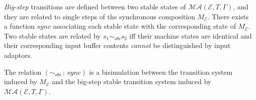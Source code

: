 \emph{Big-step} transitions are defined between two stable states of $\mathcal{MA}(\mathcal{E}, T, \Gamma)$,
and they are related to single steps of the synchronous composition $M_{\mathcal{E}}$.
%
There exists a function $\mathit{sync}$ 
associating each stable state with the corresponding state of $M_{\mathcal{E}}$.
%
Two stable states are related by $s_1 \sim_\mathit{obi} s_2$ iff 
their  machine states are identical
and 
their corresponding input buffer contents \emph{cannot} be
distinguished by input adaptors.  

\begin{theorem}\label{thm:mr-pals}   \cite{mr-pals-journal}
The relation $(\sim_\mathit{obi} \,;\, \mathit{sync})$ 
is a bisimulation between 
the transition system induced by $M_{\mathcal{E}}$
and the big-step stable transition system induced by $\mathcal{MA}(\mathcal{E}, T, \Gamma)$.
\end{theorem}










